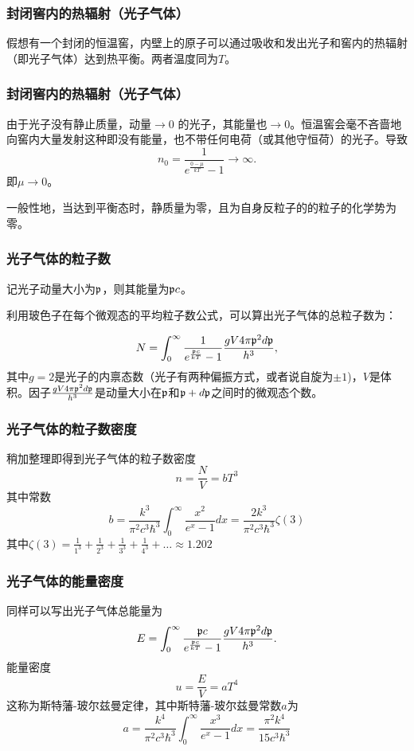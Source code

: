 \documentclass[CJK,14pt]{beamer}
\begin{document}
\begin{frame}
  \frametitle{封闭窖内的热辐射（光子气体）}
  假想有一个封闭的恒温窖，内壁上的原子可以通过吸收和发出光子和窖内的热辐射（即光子气体）达到热平衡。两者温度同为$T$。

  
\end{frame}


\begin{frame}
  \frametitle{封闭窖内的热辐射（光子气体）}
  由于光子{\blue 没有静止质量}，动量$\rightarrow 0$ 的光子，其能量也$\rightarrow 0$。恒温窖会毫不吝啬地向窖内大量发射这种即没有能量，也不带任何电荷（或其他守恒荷）的光子。导致
  $$ n_0 = \frac{1}{e^{\frac{0-\mu}{kT}}-1} \rightarrow \infty. $$
  即$\mu \rightarrow 0$。

  \skiplines
  
  一般性地，当达到平衡态时，{\blue 静质量为零，且为自身反粒子的的粒子的化学势为零。}
\end{frame}



\begin{frame}
\frametitle{光子气体的粒子数}
记光子动量大小为${\mathfrak{p}}$，则其能量为${\mathfrak{p}} c$。

利用玻色子在每个微观态的平均粒子数公式，可以算出光子气体的总粒子数为：

$$N = \int_0^\infty \frac{1}{e^{\frac{{\mathfrak{p}} c}{kT}}-1} \frac{g V 4\pi{\mathfrak{p}}^2 d{\mathfrak{p}}}{h^3}, $$
其中$g=2$是光子的内禀态数（光子有两种偏振方式，或者说自旋为$\pm 1$)，$V$是体积。因子$\frac{g V 4\pi{\mathfrak{p}}^2 d{\mathfrak{p}}}{h^3}$是动量大小在${\mathfrak{p}}$和${\mathfrak{p}}+d{\mathfrak{p}}$之间时的微观态个数。
\end{frame}

\begin{frame}
  \frametitle{光子气体的粒子数密度}

稍加整理即得到光子气体的粒子数密度
$$n = \frac{N}{V}= b T^3$$
其中常数
$$ b = \frac{k^3}{\pi^2c^3\hbar^3}\int_0^\infty  \frac{x^2 }{e^x-1} dx = \frac{2k^3}{\pi^2c^3\hbar^3} \zeta(3)  $$
其中$\zeta(3) = \frac{1}{1^3}+ \frac{1}{2^3}+\frac{1}{3^3}+\frac{1}{4^3}+\ldots\approx  1.202$

\end{frame}


\begin{frame}
  \frametitle{光子气体的能量密度}
同样可以写出光子气体总能量为
$$E = \int_0^\infty \frac{{\mathfrak{p}} c}{e^{\frac{{\mathfrak{p}} c}{kT}}-1} \frac{g V 4\pi{\mathfrak{p}}^2 d{\mathfrak{p}}}{h^3}. $$
能量密度
$$u = \frac{E}{V}= a T^4$$  
这称为斯特藩-玻尔兹曼定律，其中斯特藩-玻尔兹曼常数$a$为
$$a = \frac{k^4}{\pi^2c^3\hbar^3}\int_0^\infty  \frac{x^3 }{e^x-1} dx = \frac{\pi^2k^4}{15c^3\hbar^3}$$
\end{frame}
\end{document}

